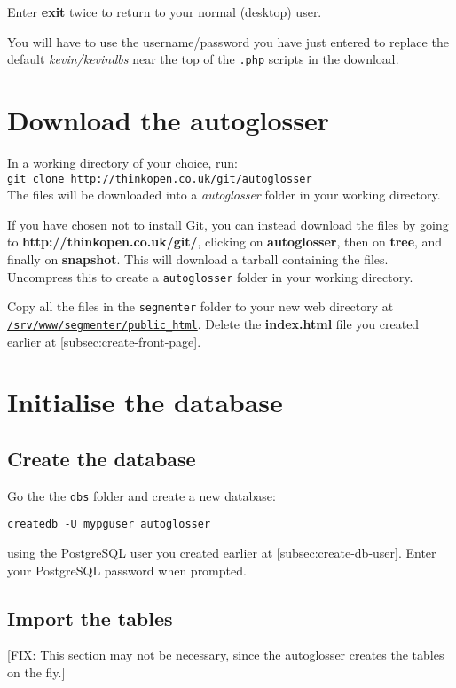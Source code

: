 \documentclass[a4paper,10pt]{article}
\begin{document}
{Enter \textbf{exit} twice to return to your normal (desktop) user.

You will have to use the username/password you have just entered to replace the default \textit{kevin/kevindbs} near the top of the \texttt{.php} scripts in the download.

\section{Download the autoglosser}

In a working directory of your choice, run:\\
\texttt{git clone http://thinkopen.co.uk/git/autoglosser}\\
The files will be downloaded into a \textit{autoglosser} folder in your working directory.

If you have chosen not to install Git, you can instead download the files by going to \textbf{http://thinkopen.co.uk/git/}, clicking on \textbf{autoglosser}, then on \textbf{tree}, and finally on \textbf{snapshot}.  This will download a tarball containing the files.  Uncompress this to create a \texttt{autoglosser} folder in your working directory.

Copy all the files in the \texttt{segmenter} folder to your new web directory at \texttt{\url{/srv/www/segmenter/public_html}}.  Delete the \textbf{index.html} file you created earlier at \ref{subsec:create-front-page}.

\section{Initialise the database}

\subsection{Create the database}

Go the the \texttt{dbs} folder and create a new database:

\texttt{createdb -U mypguser autoglosser}

using the PostgreSQL user you created earlier at \ref{subsec:create-db-user}.  Enter your PostgreSQL password when prompted.

\subsection{Import the tables}

[FIX: This section may not be necessary, since the autoglosser creates the tables on the fly.]

}
\end{document}
